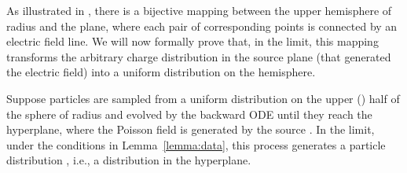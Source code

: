 As illustrated in , there is a bijective mapping between the upper hemisphere of radius  and the  plane, where each pair of corresponding points is connected by an electric field line. 
We will now formally prove that, in the  limit, this mapping transforms the arbitrary charge distribution in the source plane (that generated the electric field) into a uniform distribution on the hemisphere. 
\begin{theorem}
\label{theorem2}
 {Suppose particles are sampled from a uniform distribution on the upper () half of the sphere of radius  and evolved by the backward ODE  until they reach the  hyperplane, where the Poisson field  is generated by the source . In the  limit, {under the conditions in Lemma~\ref{lemma:data}}, this process generates a particle distribution , 
i.e., a distribution  in the  hyperplane.} 
\end{theorem}
